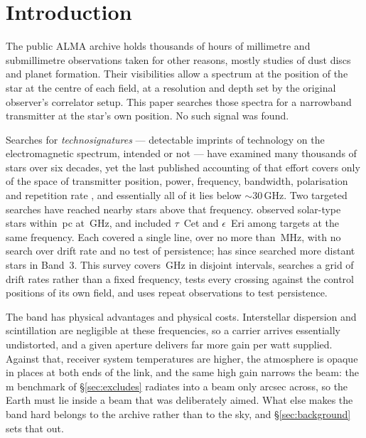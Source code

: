 \section{Introduction}
\label{sec:intro}

The public ALMA archive holds thousands of hours of millimetre and
submillimetre observations taken for other reasons, mostly studies of dust
discs and planet formation. Their visibilities allow a spectrum at the
position of the star at the centre of each field, at a resolution and depth
set by the original observer's correlator setup. This paper searches those
spectra for a narrowband transmitter at the star's own position. No such
signal was found.

Searches for \emph{technosignatures} --- detectable imprints of technology on
the electromagnetic spectrum, intended or not
\citep{Sheikh2020,SETIreview2025} --- have examined many thousands of stars
over six decades, yet the last published accounting of that effort covers
only \HaystackFrac{} of the space of transmitter position, power, frequency,
bandwidth, polarisation and repetition rate
\citep{Wright2018}, and essentially all of it lies below
${\sim}30$\,GHz. Two targeted searches have reached nearby stars above that frequency.
\citet{Steffes1994} observed \SbPriorNStarA{} solar-type stars within
\SbPriorDistA\,pc at \SbPriorFreqGHz\,GHz, and \citet{Mauersberger1996}
included $\tau$~Cet and $\epsilon$~Eri among \SbPriorNStarB{} targets at the
same frequency. Each covered a single line, over no more than
\SbPriorBandMHz\,MHz, with no search over drift rate and no test of
persistence; \citet{Mason2025} has since searched more distant stars in
Band~3. This survey covers
\DnuA\,GHz in \CovNIslands{} disjoint intervals, searches a grid of drift rates rather
than a fixed frequency, tests every crossing against the \BdNCtrl{} control positions of
its own field, and uses repeat observations to test persistence.

The band has physical advantages and physical costs. Interstellar dispersion
and scintillation are negligible at these frequencies, so a carrier arrives
essentially undistorted, and a given aperture delivers far more gain per watt
supplied. Against that, receiver system temperatures are higher, the
atmosphere is opaque in places at both ends of the link, and the same high
gain narrows the beam: the \BenchDiam\,m benchmark of
\S\ref{sec:excludes} radiates into a beam only \BmArcsec{} arcsec across, so
the Earth must lie inside a beam that was deliberately aimed. What else makes
the band hard belongs to the archive rather than to the sky, and
\S\ref{sec:background} sets that out.

